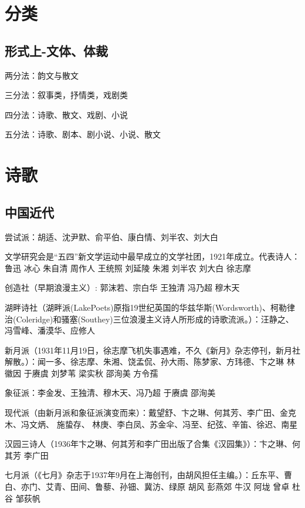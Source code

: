 \documentclass[UTF8]{../RepresentationUniverse}
\begin{document}
\chapter{分类}

\section{形式上-文体、体裁}

两分法：韵文与散文

三分法：叙事类，抒情类，戏剧类

四分法：诗歌、散文、戏剧、小说

五分法：诗歌、剧本、剧小说、小说、散文



\chapter{诗歌}


\section{中国近代}


尝试派：胡适、沈尹默、俞平伯、康白情、刘半农、刘大白


文学研究会是“五四”新文学运动中最早成立的文学社团，1921年成立。代表诗人： 鲁迅 冰心 朱自清 周作人 王统照 刘延陵 朱湘 刘半农 刘大白 徐志摩


创造社（早期浪漫主义）: 郭沫若、宗白华 王独清 冯乃超 穆木天


湖畔诗社（湖畔派(LakePoets)原指19世纪英国的华兹华斯(Wordsworth)、柯勒律治(Coleridge)和骚塞(Southey)三位浪漫主义诗人所形成的诗歌流派。）：汪静之、冯雪峰、潘漠华、应修人



新月派（1931年11月19日，徐志摩飞机失事遇难，不久《新月》杂志停刊，新月社解散。）：闻一多、徐志摩、朱湘、饶孟侃、孙大雨、陈梦家、方玮德、卞之琳 林徽因 于赓虞 刘梦苇 梁实秋   邵洵美  方令孺 


象征派：李金发、王独清、穆木天、冯乃超 于赓虞 邵洵美



现代派（由新月派和象征派演变而来）：戴望舒、卞之琳、何其芳、李广田、金克木、冯文炳、 施蛰存、 林庚、李白凤、苏金伞、冯至、纪弦、辛笛、徐迟、南星


汉园三诗人（1936年卞之琳、何其芳和李广田出版了合集《汉园集》）：卞之琳、何其芳 李广田



七月派（《七月》杂志于1937年9月在上海创刊，由胡风担任主编。）：丘东平、曹白、亦门、艾青、田间、鲁藜、孙钿、冀汸、绿原 胡风  彭燕郊 牛汉   阿垅 曾卓 杜谷 邹荻帆
\end{document}
